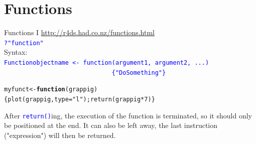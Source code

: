\documentclass[xcolor=table,      handout ,    xcolor=dvipsnames]{beamer}\usepackage[]{graphicx}\usepackage[]{color}
\makeatletter
\newcommand{\hlnum}[1]{\textcolor[rgb]{0,0,0}{#1}}
\newcommand{\hlstr}[1]{\textcolor[rgb]{0.545,0.137,0.137}{#1}}
\newcommand{\hlopt}[1]{\textcolor[rgb]{0,0,0}{#1}}
\newcommand{\hlstd}[1]{\textcolor[rgb]{0,0,0}{#1}}
\newcommand{\hlkwa}[1]{\textcolor[rgb]{1,0,0}{\textbf{#1}}}
\newcommand{\hlkwb}[1]{\textcolor[rgb]{0,0,0}{#1}}
\newcommand{\hlkwc}[1]{\textcolor[rgb]{1,0,1}{#1}}
\newcommand{\hlkwd}[1]{\textcolor[rgb]{0,0,1}{#1}}
\newenvironment{kframe}{%
 \def\at@end@of@kframe{}%
 \ifinner\ifhmode%
  \def\at@end@of@kframe{\end{minipage}}%
  \begin{minipage}{\columnwidth}%
 \fi\fi%
 \def\FrameCommand##1{\hskip\@totalleftmargin \hskip-\fboxsep
 \colorbox{shadecolor}{##1}\hskip-\fboxsep
     \hskip-\linewidth \hskip-\@totalleftmargin \hskip\columnwidth}%
 \MakeFramed {\advance\hsize-\width
   \@totalleftmargin\z@ \linewidth\hsize
   \@setminipage}}%
 {\par\unskip\endMakeFramed%
 \at@end@of@kframe}
\newenvironment{knitrout}{}{} %
\newcommand{\rcode}[1]{\texttt{\textcolor{Blue}{#1}}}
\makeatother
\begin{document}
\section{Functions}

\begin{frame}[fragile]{Functions I}
\label{functions1}
\href{http://r4ds.had.co.nz/functions.html}{http://r4ds.had.co.nz/functions.html}\\
\pause
\rcode{?"function"}\\
\pause  Syntax:\\
\rcode{Functionobjectname <- \alert{function}(argument1, argument2, ...) \\
~~~~~~~~~~~~~~~~~~~~~~~~~~~~~~\{"DoSomething"\}}\\
\pause
\begin{knitrout}
\color{fgcolor}\begin{kframe}
\begin{alltt}
\hlstd{myfunct} \hlkwb{<-} \hlkwa{function}\hlstd{(}\hlkwc{grappig}\hlstd{)}
       \hlstd{\{}\hlkwd{plot}\hlstd{(grappig,} \hlkwc{type}\hlstd{=}\hlstr{"l"}\hlstd{);} \hlkwd{return}\hlstd{(grappig}\hlopt{*}\hlnum{7}\hlstd{)  \}}
\end{alltt}
\end{kframe}
\end{knitrout}
\pause
After \rcode{return()}ing, the execution of the function is terminated, so it should only be positioned at the end. It can also be left away, the last instruction ("expression") will then be returned.
\end{frame}

\end{document}
